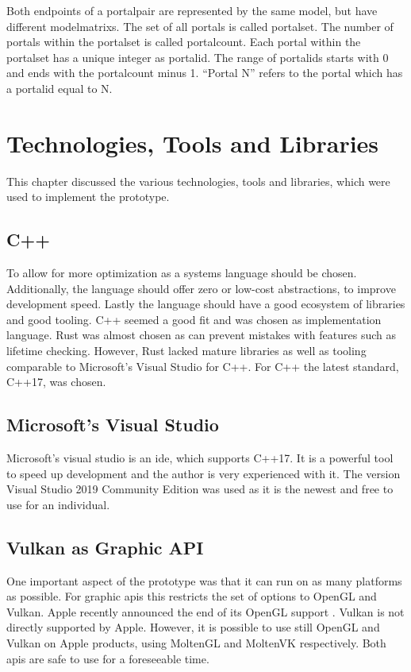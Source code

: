 Both \glspl{endpoint} of a \gls{portalpair} are represented by the same model, but have different \glspl{modelmatrix}. The set of all portals is called \gls{portalset}. The number of portals within the \gls{portalset} is called \gls{portalcount}. Each portal within the \gls{portalset} has a unique integer as \gls{portalid}. The range of \glspl{portalid} starts with 0 and ends with the \gls{portalcount} minus 1. \enquote{Portal N} refers to the portal which has a \gls{portalid} equal to N.

\section{Technologies, Tools and Libraries }
This chapter discussed the various technologies, tools and libraries, which were used to implement the prototype.

\subsection{C++}
To allow for more optimization as a systems language should be chosen. Additionally, the language should offer zero or low-cost abstractions, to improve development speed. Lastly the language should have a good ecosystem of libraries and good tooling. C++ seemed a good fit and was chosen as implementation language. Rust \cite{rustlang} was almost chosen as can prevent mistakes with features such as lifetime checking. However, Rust lacked mature libraries as well as tooling comparable to Microsoft's Visual Studio \cite{microsoft:visualstudio} for C++. For C++ the latest standard, C++17, was chosen.

\subsection{Microsoft's Visual Studio}
Microsoft's visual studio is an \gls{ide}, which supports C++17. It is a powerful tool to speed up development and the author is very experienced with it. The version Visual Studio 2019 Community Edition was used as it is the newest and free to use for an individual.

\subsection{Vulkan as Graphic API}
One important aspect of the prototype was that it can run on as many platforms as possible. %
For graphic \glspl{api} this restricts the set of options to OpenGL and Vulkan. Apple recently announced the end of its OpenGL support \cite{arstechnica:openGL}. Vulkan is not directly supported by Apple. However, it is possible to use still OpenGL and Vulkan on Apple products, using MoltenGL \cite{moltenGL} and MoltenVK \cite{moltenVK} respectively. Both \glspl{api} are safe to use for a foreseeable time.

